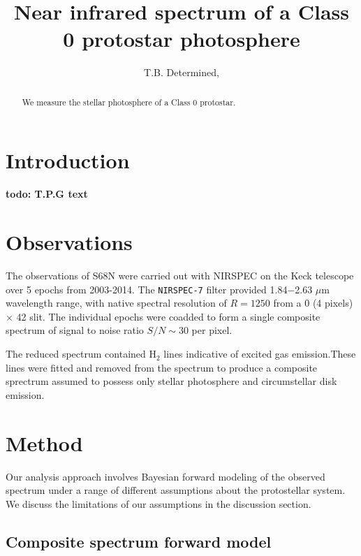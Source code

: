 \documentclass[twocolumn]{emulateapj}%
\begin{document}
 
\title{Near infrared spectrum of a Class 0 protostar photosphere}

\author{T.B. Determined,}



\begin{abstract}
We measure the stellar photosphere of a Class 0 protostar.
\end{abstract}


\maketitle


\section{Introduction}\label{sec:intro}

\textbf{todo: T.P.G text}

\section{Observations}
The observations of S68N were carried out with NIRSPEC on the Keck telescope over 5 epochs from 2003-2014.  The \texttt{NIRSPEC-7} filter provided 1.84$-$2.63 $\mu$m wavelength range, with native spectral resolution of $R=1250$ from a 0 (4 pixels) $\times$ 42 slit.  The individual epochs were coadded to form a single composite spectrum of signal to noise ratio $S/N\sim30$ per pixel.

The reduced spectrum contained H$_2$ lines indicative of excited gas emission.These lines were fitted and removed from the spectrum to produce a composite sprectrum assumed to possess only stellar photosphere and circumstellar disk emission.


\section{Method}

Our analysis approach involves Bayesian forward modeling of the observed spectrum under a range of different assumptions about the protostellar system.  We discuss the limitations of our assumptions in the discussion section.

\subsection{Composite spectrum forward model}
\end{document}
